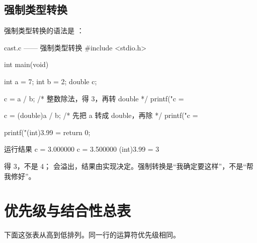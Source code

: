 \subsection{强制类型转换}

强制类型转换的语法是 ：

\begin{codebox}{cast.c —— 强制类型转换}
#include <stdio.h>

int main(void)
{
    int a = 7;
    int b = 2;
    double c;

    c = a / b;              /* 整数除法，得 3，再转 double */
    printf("c = %

    c = (double)a / b;      /* 先把 a 转成 double，再除 */
    printf("c = %

    printf("(int)3.99 = %
    return 0;
}
\end{codebox}

\begin{outbox}{运行结果}
c = 3.000000
c = 3.500000
(int)3.99 = 3
\end{outbox}

\begin{pitfall}[强制转换可能丢失精度]
 得 3，不是 4； 会溢出，结果由实现决定。强制转换是“我确定要这样”，不是“帮我修好”。
\end{pitfall}

\section{优先级与结合性总表}

下面这张表从高到低排列。同一行的运算符优先级相同。

